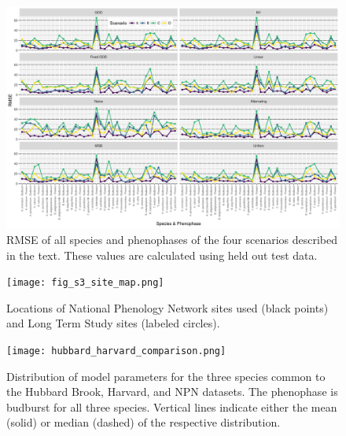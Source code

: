 \documentclass[fleqn,10pt,lineno]{wlpeerj} %
\begin{document}
\begin{figure}
	\centering
		\includegraphics[width=1\textwidth]{supplement_scenario_absolute_rmse.png}
	\caption{RMSE of all species and phenophases of the four scenarios described in the text. These values are calculated using held out test data.}
\end{figure}

\begin{figure}
	\centering
		\texttt{[image: fig\_s3\_site\_map.png]}
	\caption{Locations of National Phenology Network sites used (black points) and Long Term Study sites (labeled circles).}
\end{figure}

\begin{figure}
	\centering
		\texttt{[image: hubbard\_harvard\_comparison.png]}
	\caption{Distribution of model parameters for the three species common to the Hubbard Brook, Harvard, and NPN datasets. The phenophase is budburst for all three species. Vertical lines indicate either the mean (solid) or median (dashed) of the respective distribution.}
\end{figure}
\end{document}
